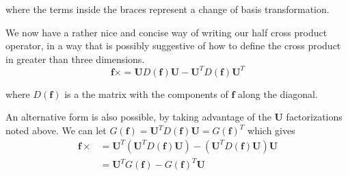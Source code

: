 \documentclass{article}      %
\newcommand{\Bf}[0]{\mathbf{f}}
\newcommand{\BU}[0]{\mathbf{U}}
\newcommand{\cross}[0]{\times}
\begin{document}
where the terms inside the braces represent a change of basis transformation.

We now have a rather nice and concise way of writing our half cross product operator, in a way
that is possibly suggestive of how to define the cross product in greater than three dimensions.
\begin{equation*}
\Bf \cross = \BU D(\Bf) \BU - \BU^T D(\Bf) \BU^T
\end{equation*}

where $D(\Bf)$ is a the matrix with the components of $\Bf$ along the diagonal.

An alternative form is also possible, by taking advantage of the $\BU$ factorizations noted above.
We can let $G(\Bf) = \BU^T D(\Bf) \BU = G(\Bf)^T$ which gives
\begin{align*}
\Bf \cross &= \BU^T (\BU^T D(\Bf) \BU) - (\BU^T D(\Bf) \BU) \BU \\
           &= \BU^T G(\Bf) - G(\Bf)^T \BU
\end{align*}
\end{document}
